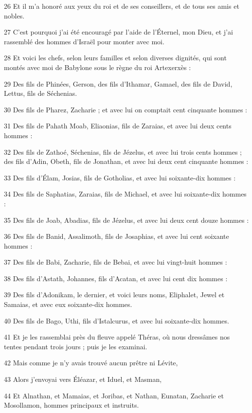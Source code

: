 \par 26 Et il m'a honoré aux yeux du roi et de ses conseillers, et de tous ses amis et nobles.
\par 27 C'est pourquoi j'ai été encouragé par l'aide de l'Éternel, mon Dieu, et j'ai rassemblé des hommes d'Israël pour monter avec moi.
\par 28 Et voici les chefs, selon leurs familles et selon diverses dignités, qui sont montés avec moi de Babylone sous le règne du roi Artexerxès :
\par 29 Des fils de Phinées, Gerson, des fils d'Ithamar, Gamael, des fils de David, Lettus, fils de Séchenias.
\par 30 Des fils de Pharez, Zacharie ; et avec lui on comptait cent cinquante hommes :
\par 31 Des fils de Pahath Moab, Eliaonias, fils de Zaraias, et avec lui deux cents hommes :
\par 32 Des fils de Zathoé, Séchenias, fils de Jézelus, et avec lui trois cents hommes ; des fils d'Adin, Obeth, fils de Jonathan, et avec lui deux cent cinquante hommes :
\par 33 Des fils d'Élam, Josias, fils de Gotholias, et avec lui soixante-dix hommes :
\par 34 Des fils de Saphatias, Zaraias, fils de Michael, et avec lui soixante-dix hommes :
\par 35 Des fils de Joab, Abadias, fils de Jézelus, et avec lui deux cent douze hommes :
\par 36 Des fils de Banid, Assalimoth, fils de Josaphias, et avec lui cent soixante hommes :
\par 37 Des fils de Babi, Zacharie, fils de Bebai, et avec lui vingt-huit hommes :
\par 38 Des fils d'Astath, Johannes, fils d'Acatan, et avec lui cent dix hommes :
\par 39 Des fils d'Adonikam, le dernier, et voici leurs noms, Eliphalet, Jewel et Samaias, et avec eux soixante-dix hommes.
\par 40 Des fils de Bago, Uthi, fils d'Istalcurus, et avec lui soixante-dix hommes.
\par 41 Et je les rassemblai près du fleuve appelé Théras, où nous dressâmes nos tentes pendant trois jours ; puis je les examinai.
\par 42 Mais comme je n'y avais trouvé aucun prêtre ni Lévite,
\par 43 Alors j'envoyai vers Éléazar, et Iduel, et Masman,
\par 44 Et Alnathan, et Mamaias, et Joribas, et Nathan, Eunatan, Zacharie et Mosollamon, hommes principaux et instruits.
